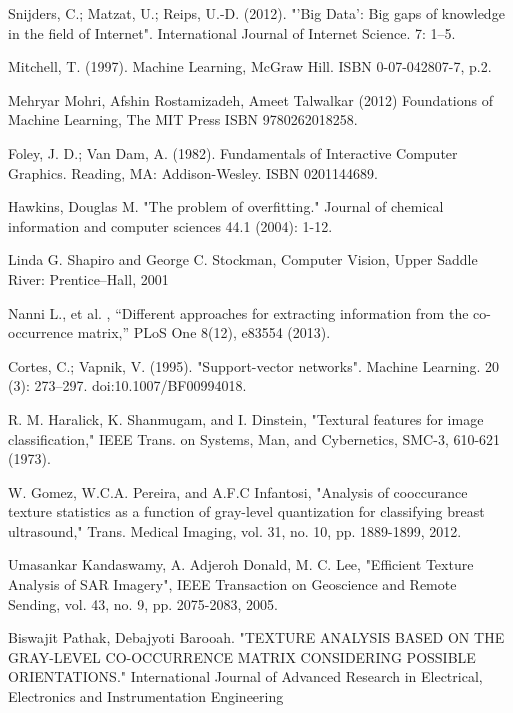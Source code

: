 \begin{thebibliography}{99}
\setlength{\parskip}{1em}

Snijders, C.; Matzat, U.; Reips, U.-D. (2012). "'Big Data': Big gaps of knowledge in the field of Internet". International Journal of Internet Science. 7: 1–5.

Mitchell, T. (1997). Machine Learning, McGraw Hill. ISBN 0-07-042807-7, p.2.

Mehryar Mohri, Afshin Rostamizadeh, Ameet Talwalkar (2012) Foundations of Machine Learning, The MIT Press ISBN 9780262018258.

Foley, J. D.; Van Dam, A. (1982). Fundamentals of Interactive Computer Graphics. Reading, MA: Addison-Wesley. ISBN 0201144689.

Hawkins, Douglas M. "The problem of overfitting." Journal of chemical information and computer sciences 44.1 (2004): 1-12.

Linda G. Shapiro and George C. Stockman, Computer Vision, Upper Saddle River: Prentice–Hall, 2001

Nanni L., et al. , “Different approaches for extracting information from the co-occurrence matrix,” PLoS One 8(12), e83554 (2013).

Cortes, C.; Vapnik, V. (1995). "Support-vector networks". Machine Learning. 20 (3): 273–297. doi:10.1007/BF00994018.

R. M. Haralick, K. Shanmugam, and I. Dinstein, "Textural features for image classification," IEEE Trans. on Systems, Man, and Cybernetics, SMC-3, 610-621 (1973).

W. Gomez, W.C.A. Pereira, and A.F.C Infantosi, "Analysis of cooccurance texture statistics as a function of gray-level quantization for classifying breast ultrasound," Trans. Medical Imaging, vol. 31, no. 10, pp. 1889-1899, 2012.

Umasankar Kandaswamy, A. Adjeroh Donald, M. C. Lee, "Efficient Texture Analysis of SAR Imagery", IEEE Transaction on Geoscience and Remote Sending, vol. 43, no. 9, pp. 2075-2083, 2005.

Biswajit Pathak, Debajyoti Barooah. "TEXTURE ANALYSIS BASED ON THE GRAY-LEVEL CO-OCCURRENCE MATRIX CONSIDERING POSSIBLE ORIENTATIONS." International Journal of Advanced Research in Electrical, Electronics and Instrumentation Engineering 


\end{thebibliography}

